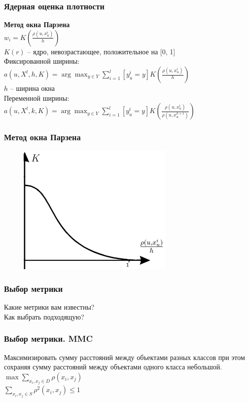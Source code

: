 \documentclass[12pt]{beamer}
\begin{document}
\begin{frame}\frametitle{Ядерная оценка плотности}
\textbf{Метод окна Парзена}\\
${w_i = K(\frac{\rho(u, x_u^i)}{h})}$\\
$K(r)$ -- ядро, невозрастающее, положительное на [0, 1]\\
\vspace{8mm} 
Фиксированной ширины:\\
${a(u, X^l, h, K) = \arg\max_{y \in Y} \sum\limits_{i=1}^l [y_u^i = y] K(\frac{\rho(u, x_u^i)}{h})}$\\
$h$ -- ширина окна\\
\vspace{5mm}
Переменной ширины:\\
${a(u, X^l, k, K) = \arg\max_{y \in Y} \sum\limits_{i=1}^l [y_u^i = y] K(\frac{\rho(u, x_u^i)}{\rho(u, x_u^{k+1})})}$

\end{frame}

\begin{frame}\frametitle{Метод окна Парзена}
\begin{figure}[htbp]
  \includegraphics[height=180pt, keepaspectratio = true]{parzen1}  
\end{figure}
\end{frame}

\begin{frame}\frametitle{Выбор метрики}
Какие метрики вам известны?\\
Как выбрать подходящую? 
\end{frame}

\begin{frame}\frametitle{Выбор метрики. MMC}
Максимизировать сумму расстояний между объектами разных классов
при этом сохраняя сумму расстояний между объектами одного класса небольшой.\\
\vspace{8mm}
${\max \sum_{x_i, x_j \in D} \rho(x_i, x_j) }$\\
\vspace{8mm}
${\sum_{x_i, x_j \in S} \rho^2(x_i, x_j) \leq 1 }$
\end{frame}
\end{document}
